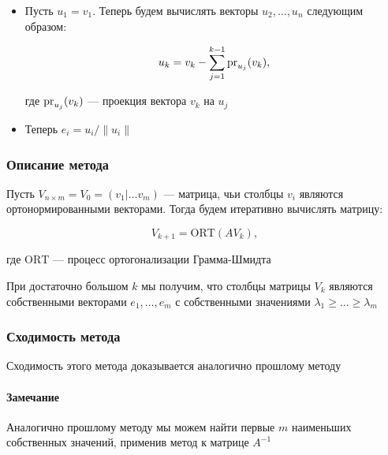 \begin{itemize}
    \item Пусть $u_1 = v_1$. Теперь будем вычислять векторы $u_2, \ldots, u_n$ следующим образом:

    \[
    u_k = v_k - \sum\limits_{j = 1}^{k-1} \operatorname{pr}_{u_j} (v_k),
    \]

    где $\operatorname{pr}_{u_j} (v_k)$ --- проекция вектора $v_k$ на $u_j$

    \item Теперь $e_i = u_i / \lVert u_i \rVert$
\end{itemize}

\subsubsection*{Описание метода}

Пусть $V_{n \times m} = V_0 = (v_1 | \ldots v_m)$ --- матрица, чьи столбцы $v_i$ являются ортонормированными векторами. Тогда будем итеративно вычислять матрицу:

\[
V_{k+1} = \mathrm{ORT}(A V_k),
\]

где $\mathrm{ORT}$ --- процесс ортогонализации Грамма-Шмидта

При достаточно большом $k$ мы получим, что столбцы матрицы $V_k$ являются собственными векторами $e_1, \ldots, e_m$ с собственными значениями $\lambda_1 \geqslant \ldots \geqslant \lambda_m$

\subsubsection*{Сходимость метода}

Сходимость этого метода доказывается аналогично прошлому методу

\paragraph{Замечание} Аналогично прошлому методу мы можем найти первые $m$ наименьших собственных значений, применив метод к матрице $A^{-1}$
